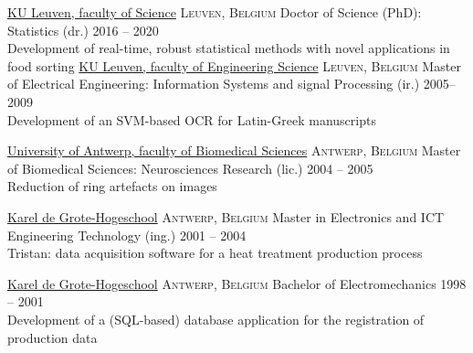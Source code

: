 \documentclass[10pt,a4paper]{article}
\begin{document}
\vspace{+1em} 


\spacedhrule{-0.2em}{-0.4em}
{}

\headedsection
  {\href{https://wet.kuleuven.be/english}{KU Leuven, faculty of Science}}
  {\textsc{Leuven, Belgium}} {%
  \headedsubsection
    {Doctor of Science (PhD): Statistics (dr.)}
    {2016 -- 2020}{\\Development of real-time, robust statistical methods with novel applications in food sorting}
}
\vspace{+0.2em}
\headedsection
  {\href{https://eng.kuleuven.be/en}{KU Leuven, faculty of Engineering Science}}
  {\textsc{Leuven, Belgium}} {%
  \headedsubsection
    {Master of Electrical Engineering: Information Systems and signal Processing (ir.)}
    {2005--2009} {\\Development of an SVM-based OCR for Latin-Greek manuscripts}
}

\vspace{+0.2em}
\headedsection
  {\href{https://www.uantwerpen.be/en/}{University of Antwerp, faculty of Biomedical Sciences}}
  {\textsc{Antwerp, Belgium}} {%
  \headedsubsection
    {Master of Biomedical Sciences: Neurosciences Research (lic.)}
    {2004 -- 2005} {\\Reduction of ring artefacts on  images}
}

\vspace{+0.2em}
\headedsection
{\href{https://www.kdg.be/}{Karel de Grote-Hogeschool}}
{\textsc{Antwerp, Belgium}} {%
	\headedsubsection
	{Master in Electronics and ICT Engineering Technology (ing.)}
	{2001 -- 2004} {\\Tristan: data acquisition software for a heat treatment production process}
}

\vspace{+0.2em}
\headedsection
{\href{https://www.kdg.be/}{Karel de Grote-Hogeschool}}
{\textsc{Antwerp, Belgium}} {%
	\headedsubsection
	{Bachelor of Electromechanics}
	{1998 -- 2001} {\\Development of a (SQL-based) database application for the registration of production data}
}
\end{document}
